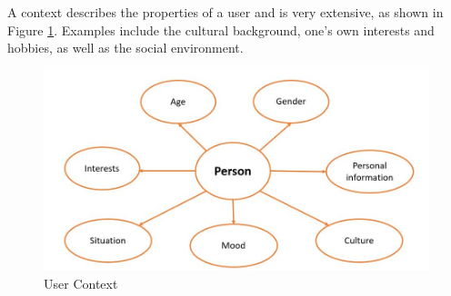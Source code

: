 A context describes the properties of a user and is very extensive, as shown in Figure \ref{fig:context}. Examples include the cultural background, one's own interests and hobbies, as well as the social environment.

\begin{figure}[!h]
	\centering
	\includegraphics[width=1\linewidth]{Picture/Kontext}
	\caption[User Context]{User Context}
	\label{fig:context}
\end{figure}





